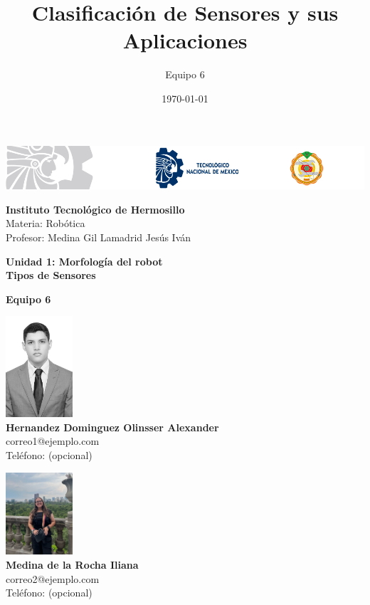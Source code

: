 \documentclass{article}
\title{Clasificación de Sensores y sus Aplicaciones}
\author{Equipo 6}
\date{\today}
\begin{document}
	
	\begin{titlepage}
		
		\begin{center}
			
			\includegraphics[width=\textwidth]{header-ith.png}
			
			\vspace{0.5cm}
			
			\textbf{Instituto Tecnológico de Hermosillo} \\
			Materia: Robótica \\
			Profesor: Medina Gil Lamadrid Jesús Iván \\
			
			\vspace{0.5cm}
			
			\textbf{Unidad 1: Morfología del robot} \\
			{\Huge \textbf{Tipos de Sensores}} \\
			
			\vspace{0.5cm}
			
			\textbf{Equipo 6} \\
			
			\begin{minipage}{0.45\textwidth}
				\begin{center}
					\includegraphics[width=2.5cm]{alexander.jpg} \\
					\textbf{Hernandez Dominguez Olinsser Alexander} \\
					correo1@ejemplo.com \\
					Teléfono: (opcional)
				\end{center}
			\end{minipage}
			\hfill
			\begin{minipage}{0.45\textwidth}
				\begin{center}
					\includegraphics[width=2.5cm]{iliana.jpg} \\
					\textbf{Medina de la Rocha Iliana} \\
					correo2@ejemplo.com \\
					Teléfono: (opcional)
				\end{center}
			\end{minipage}
			

\end{center}
\end{titlepage}
\end{document}
